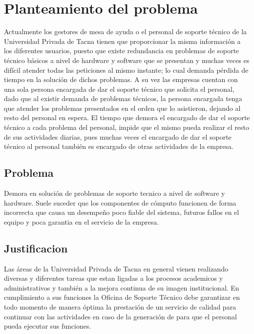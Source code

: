 \documentclass[preprint,12pt]{elsarticle}
\begin{document}


\section{Planteamiento del problema}
Actualmente los gestores de mesa de ayuda o el personal de soporte técnico de la Universidad Privada de Tacna tienen que proporcionar la misma información a los diferentes usuarios, puesto que existe redundancia en problemas de soporte técnico básicos a nivel de hardware y software que se presentan y muchas veces es difícil atender todas las peticiones al mismo instante; lo cual demanda pérdida de tiempo en la solución de dichos problemas. A su vez las empresas  cuentan con una sola persona encargada de dar el soporte técnico que solicita el personal, dado que al existir demanda de problemas técnicos, la persona encargada tenga que atender los problemas presentados en el orden que lo asistieron, dejando al resto del personal en espera. El tiempo que demora el encargado de dar el soporte técnico a cada problema del personal, impide que el mismo pueda realizar el resto de sus actividades diarias, pues muchas veces el encargado de dar el soporte técnico al personal también es encargado de otras actividades de la empresa. 


\subsection {\textbf{Problema}}
Demora en solución de problemas de soporte tecnico a nivel de software y hardware. Suele suceder que los componentes de cómputo funcionen de forma incorrecta que causa un desempeño poco fiable del sistema, futuros fallos en el equipo y poca garantia en el servicio de la empresa.


\subsection {\textbf{Justificacion}}

Las áreas de la Universidad Privada de Tacna en general vienen realizando diversas y diferentes tareas que estan ligadas a los procesos academicos y administrativos y también a la mejora continua de su imagen institucional.
En cumplimiento a sus funciones la Oficina de Soporte Técnico debe garantizar en todo momento de manera óptima la prestación de un servicio de calidad para continuar con las actividades en caso de la generación de para que el personal pueda ejecutar sus funciones.
 
\end{document}
